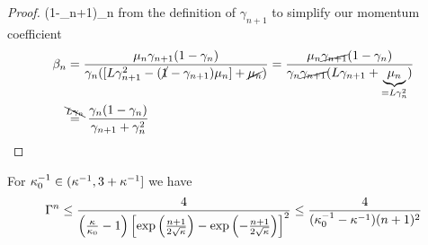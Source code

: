 \begin{proof}
	(1-\gamma_{n+1})\lbound_n\) from the definition of \(\gamma_{n+1}\) to simplify our
	momentum coefficient
	\begin{align*}
		\momCoeff_n
		&= \frac{\lbound_n \gamma_{n+1}(1-\gamma_n)}{
			\gamma_n([\ubound\gamma_{n+1}^2 - (\cancel{1}-\gamma_{n+1})\lbound_n] +\cancel{\lbound_n})
		}
		= \frac{\lbound_n\cancel{\gamma_{n+1}}(1-\gamma_n)}{
			\gamma_n\cancel{\gamma_{n+1}}(\ubound\gamma_{n+1} + \underbrace{\lbound_n}_{=\ubound\gamma_n^2})
		}\\
		&\lxeq{\bcancel{\ubound\gamma_n}} \frac{\gamma_n(1-\gamma_n)}{\gamma_{n+1} + \gamma_n^2}
		\qedhere
	\end{align*}
\end{proof}

\begin{lemma}
	\label{lem-appendix: convergence rate bounds for estimating sequences}
	For \(\kappa_0^{-1}\in (\kappa^{-1}, 3 + \kappa^{-1}]\) we have
	\begin{align*}
		\Gamma^n
		\le \frac{4}{\left(\frac{\kappa}{\kappa_0}-1\right)\left[
			\exp\left(\frac{n+1}{2\sqrt{\kappa}}\right)
			-\exp\left(-\frac{n+1}{2\sqrt{\kappa}}\right)
		\right]^2}
		\le \frac{4}{(\kappa_0^{-1}-\kappa^{-1})(n+1)^2}
	\end{align*}
\end{lemma}
